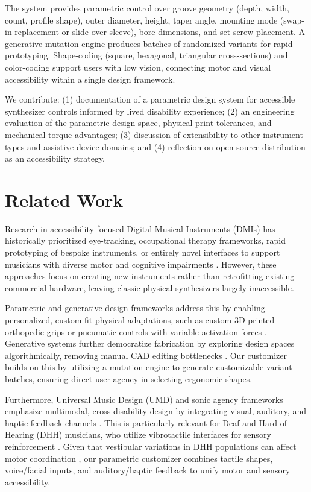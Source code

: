 \documentclass[manuscript,screen,review,anonymous]{acmart}
\begin{document}
The system provides parametric control over groove geometry (depth, width, count, profile shape), outer diameter, height, taper angle, mounting mode (swap-in replacement or slide-over sleeve), bore dimensions, and set-screw placement. A generative mutation engine produces batches of randomized variants for rapid prototyping. Shape-coding (square, hexagonal, triangular cross-sections) and color-coding support users with low vision, connecting motor and visual accessibility within a single design framework.

We contribute: (1) documentation of a parametric design system for accessible synthesizer controls informed by lived disability experience; (2) an engineering evaluation of the parametric design space, physical print tolerances, and mechanical torque advantages; (3) discussion of extensibility to other instrument types and assistive device domains; and (4) reflection on open-source distribution as an accessibility strategy.

\section{Related Work}

Research in accessibility-focused Digital Musical Instruments (DMIs) has historically prioritized eye-tracking, occupational therapy frameworks, rapid prototyping of bespoke instruments, or entirely novel interfaces to support musicians with diverse motor and cognitive impairments \cite{frid2019accessible, mcmillan2023designing, mccloskey2015accessibility, payne2020eye, holland2020expanding}. However, these approaches focus on creating new instruments rather than retrofitting existing commercial hardware, leaving classic physical synthesizers largely inaccessible. 

Parametric and generative design frameworks address this by enabling personalized, custom-fit physical adaptations, such as custom 3D-printed orthopedic grips or pneumatic controls with variable activation forces \cite{tandon2023parametric, santos2023parametric, desai20153dprinting}. Generative systems further democratize fabrication by exploring design spaces algorithmically, removing manual CAD editing bottlenecks \cite{hofmann2020living}. Our customizer builds on this by utilizing a mutation engine to generate customizable variant batches, ensuring direct user agency in selecting ergonomic shapes.

Furthermore, Universal Music Design (UMD) and sonic agency frameworks emphasize multimodal, cross-disability design by integrating visual, auditory, and haptic feedback channels \cite{hergert2024gestolumina, cavdir2024sonic}. This is particularly relevant for Deaf and Hard of Hearing (DHH) musicians, who utilize vibrotactile interfaces for sensory reinforcement \cite{cavdir2022touch, cavdir2020felt}. Given that vestibular variations in DHH populations can affect motor coordination \cite{wink2018balance}, our parametric customizer combines tactile shapes, voice/facial inputs, and auditory/haptic feedback to unify motor and sensory accessibility.
\end{document}
